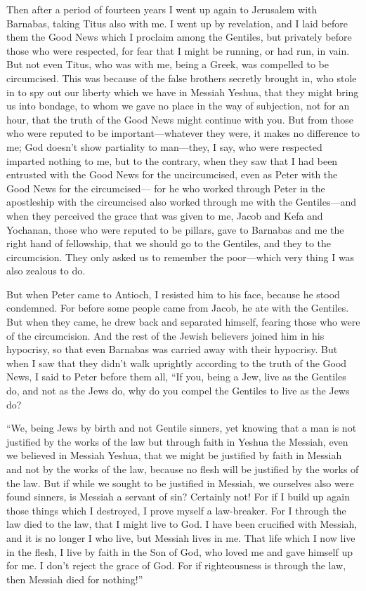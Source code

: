 \mychapter{} \myverse*{}Then after a period of fourteen years I went up again to Jerusalem
with Barnabas, taking Titus also with me.
\myverse{}I went up by revelation, and I laid before them the Good News which I proclaim
among the Gentiles, but privately before those who were respected, for fear that I might be running, or
had run, in vain.
\myverse{}But not even Titus, who was with me, being a Greek, was compelled to be circumcised.
\myverse{}This was because of the false brothers secretly brought in, who stole in to
spy out our liberty which we have in Messiah Yeshua, that they might bring us into bondage,
\myverse{}to whom we gave no place in the way of subjection, not for an hour, that the
truth of the Good News might continue with you.
\myverse{}But from those who were reputed to be important—whatever they were, it makes
no difference to me; God doesn’t show partiality to man—they, I say, who were respected imparted nothing
to me,
\myverse{}but to the contrary, when they saw that I had been entrusted with the Good News
for the uncircumcised, even as Peter with the Good News for the circumcised—
\myverse{}for he who worked through Peter in the apostleship with the circumcised also worked through me with the Gentiles—\myverse{}and when they perceived the grace that was given to me, Jacob and Kefa and Yochanan, those who were reputed to be pillars, gave to Barnabas and me the right hand of fellowship, that we should go to the Gentiles, and they to the circumcision. \myverse{}They only asked us to remember the poor—which very thing I was also zealous
to do.

\myverse{}But when Peter came to Antioch, I resisted him to his face, because
he stood condemned.
\myverse{}For before some people came from Jacob, he ate with the Gentiles. But when
they came, he drew back and separated himself, fearing those who were of the circumcision.
\myverse{}And the rest of the Jewish believers joined him in his hypocrisy, so that
even Barnabas was carried away with their hypocrisy.
\myverse{}But when I saw that they didn’t walk uprightly according to the truth of the
Good News, I said to Peter before them all, “If you, being a Jew, live as the Gentiles do, and not as
the Jews do, why do you compel the Gentiles to live as the Jews do?

\myverse{}“We, being Jews by birth and not Gentile sinners,
\myverse{}yet knowing that a man is not justified by the works of the law but through
faith in Yeshua the Messiah, even we believed in Messiah Yeshua, that we might be justified by faith in
Messiah and not by the works of the law, because no flesh will be justified by the works of the law.
\myverse{}But if while we sought to be justified in Messiah, we ourselves also were
found sinners, is Messiah a servant of sin? Certainly not!
\myverse{}For if I build up again those things which I destroyed, I prove myself a law-breaker.
\myverse{}For I through the law died to the law, that I might live to God.
\myverse{}I have been crucified with Messiah, and it is no longer I who live, but Messiah
lives in me. That life which I now live in the flesh, I live by faith in the Son of God, who loved me
and gave himself up for me.
\myverse{}I don’t reject the grace of God. For if righteousness is through the law,
then Messiah died for nothing!”


